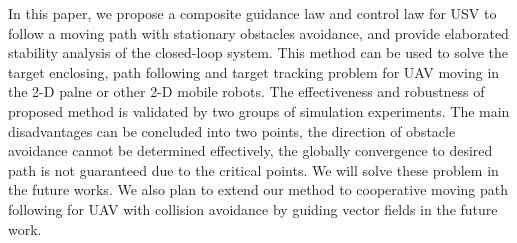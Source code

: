 \documentclass[a4paper, 10pt, conference]{ieeeconf}      %
\begin{document}
In this paper, we propose a composite guidance law and control law for USV to follow a moving path with stationary obstacles avoidance, and provide elaborated stability analysis of the closed-loop system. This method can be used to solve the target enclosing, path following and target tracking problem for UAV moving in the 2-D palne or other 2-D mobile robots. The effectiveness and robustness of proposed method is validated by two groups of simulation experiments. The main disadvantages can be concluded into two points, the direction of obstacle avoidance cannot be determined effectively, the globally convergence to desired path is not guaranteed due to the critical points. We will solve these problem in the future works. We also plan to extend our method to cooperative moving path following for UAV with collision avoidance by guiding vector fields in the future work. 

\addtolength{\textheight}{-12cm}   %










\end{document}
